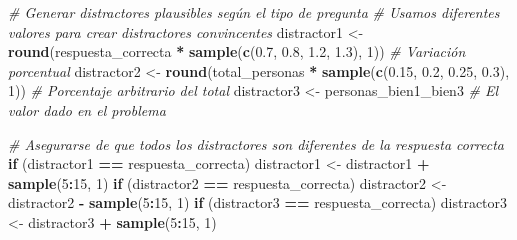 \documentclass[
]{article}
\newenvironment{Shaded}{\begin{snugshade}}{\end{snugshade}}
\newcommand{\CommentTok}[1]{\textcolor[rgb]{0.56,0.35,0.01}{\textit{#1}}}
\newcommand{\ControlFlowTok}[1]{\textcolor[rgb]{0.13,0.29,0.53}{\textbf{#1}}}
\newcommand{\DecValTok}[1]{\textcolor[rgb]{0.00,0.00,0.81}{#1}}
\newcommand{\FloatTok}[1]{\textcolor[rgb]{0.00,0.00,0.81}{#1}}
\newcommand{\FunctionTok}[1]{\textcolor[rgb]{0.13,0.29,0.53}{\textbf{#1}}}
\newcommand{\NormalTok}[1]{#1}
\newcommand{\OtherTok}[1]{\textcolor[rgb]{0.56,0.35,0.01}{#1}}
\newcommand{\SpecialCharTok}[1]{\textcolor[rgb]{0.81,0.36,0.00}{\textbf{#1}}}
\begin{document}
\begin{Shaded}
\begin{Highlighting}[]
\CommentTok{\# Generar distractores plausibles según el tipo de pregunta}
\CommentTok{\# Usamos diferentes valores para crear distractores convincentes}
\NormalTok{distractor1 }\OtherTok{\textless{}{-}} \FunctionTok{round}\NormalTok{(respuesta\_correcta }\SpecialCharTok{*} \FunctionTok{sample}\NormalTok{(}\FunctionTok{c}\NormalTok{(}\FloatTok{0.7}\NormalTok{, }\FloatTok{0.8}\NormalTok{, }\FloatTok{1.2}\NormalTok{, }\FloatTok{1.3}\NormalTok{), }\DecValTok{1}\NormalTok{))  }\CommentTok{\# Variación porcentual}
\NormalTok{distractor2 }\OtherTok{\textless{}{-}} \FunctionTok{round}\NormalTok{(total\_personas }\SpecialCharTok{*} \FunctionTok{sample}\NormalTok{(}\FunctionTok{c}\NormalTok{(}\FloatTok{0.15}\NormalTok{, }\FloatTok{0.2}\NormalTok{, }\FloatTok{0.25}\NormalTok{, }\FloatTok{0.3}\NormalTok{), }\DecValTok{1}\NormalTok{))    }\CommentTok{\# Porcentaje arbitrario del total}
\NormalTok{distractor3 }\OtherTok{\textless{}{-}}\NormalTok{ personas\_bien1\_bien3  }\CommentTok{\# El valor dado en el problema}

\CommentTok{\# Asegurarse de que todos los distractores son diferentes de la respuesta correcta}
\ControlFlowTok{if}\NormalTok{ (distractor1 }\SpecialCharTok{==}\NormalTok{ respuesta\_correcta) distractor1 }\OtherTok{\textless{}{-}}\NormalTok{ distractor1 }\SpecialCharTok{+} \FunctionTok{sample}\NormalTok{(}\DecValTok{5}\SpecialCharTok{:}\DecValTok{15}\NormalTok{, }\DecValTok{1}\NormalTok{)}
\ControlFlowTok{if}\NormalTok{ (distractor2 }\SpecialCharTok{==}\NormalTok{ respuesta\_correcta) distractor2 }\OtherTok{\textless{}{-}}\NormalTok{ distractor2 }\SpecialCharTok{{-}} \FunctionTok{sample}\NormalTok{(}\DecValTok{5}\SpecialCharTok{:}\DecValTok{15}\NormalTok{, }\DecValTok{1}\NormalTok{)}
\ControlFlowTok{if}\NormalTok{ (distractor3 }\SpecialCharTok{==}\NormalTok{ respuesta\_correcta) distractor3 }\OtherTok{\textless{}{-}}\NormalTok{ distractor3 }\SpecialCharTok{+} \FunctionTok{sample}\NormalTok{(}\DecValTok{5}\SpecialCharTok{:}\DecValTok{15}\NormalTok{, }\DecValTok{1}\NormalTok{)}


\end{Highlighting}
\end{Shaded}
\end{document}
